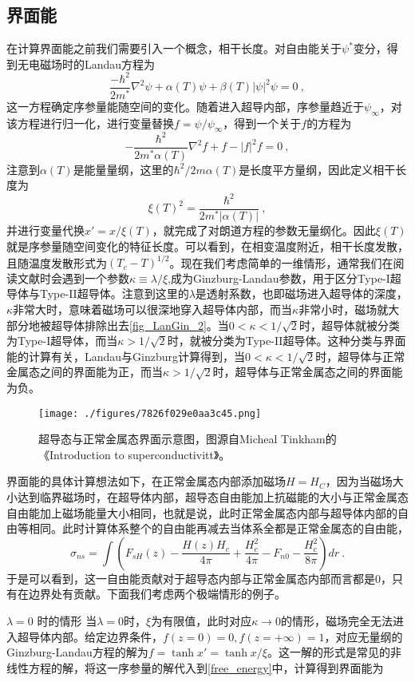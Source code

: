 \subsection{界面能}
在计算界面能之前我们需要引入一个概念，相干长度。对自由能关于$\psi^*$变分，得到无电磁场时的Landau方程为
\begin{equation}
\frac{-\hbar^2}{2m^*}\nabla^2 \psi + \alpha(T)\psi + \beta(T)|\psi|^2 \psi = 0~,
\end{equation}
这一方程确定序参量能随空间的变化。随着进入超导内部，序参量趋近于$\psi_{\infty}$，对该方程进行归一化，进行变量替换$f= \psi/\psi_{\infty}$，得到一个关于$f$的方程为
\begin{equation}
-\frac{\hbar^2}{2m^* \alpha(T)} \nabla^2 f + f - |f|^2 f =0 ~,
\end{equation}
注意到$\alpha(T)$是能量量纲，这里的$\hbar^2/2m \alpha(T)$是长度平方量纲，因此定义相干长度为
\begin{equation}
\xi(T)^2 =\frac{\hbar^2}{2m^* |\alpha(T)|}~,
\end{equation}
并进行变量代换$x' = x/\xi(T)$，就完成了对朗道方程的参数无量纲化。因此$\xi(T)$就是序参量随空间变化的特征长度。可以看到，在相变温度附近，相干长度发散，且随温度发散形式为$(T_c-T)^{1/2}$。现在我们考虑简单的一维情形，通常我们在阅读文献时会遇到一个参数$\kappa \equiv \lambda/\xi$,成为Ginzburg-Landau参数，用于区分Type-I超导体与Type-II超导体。注意到这里的$\lambda$是透射系数，也即磁场进入超导体的深度，$\kappa$非常大时，意味着磁场可以很深地穿入超导体内部，而当$\kappa$非常小时，磁场就大部分地被超导体排除出去\autoref{fig_LanGin_2}。当$0<\kappa<1/\sqrt{2}$时，超导体就被分类为Type-I超导体，而当$\kappa>1/\sqrt{2}$时，就被分类为Type-II超导体。这种分类与界面能的计算有关，Landau与Ginzburg计算得到，当$0<\kappa<1/\sqrt{2}$时，超导体与正常金属态之间的界面能为正，而当$\kappa>1/\sqrt{2}$时，超导体与正常金属态之间的界面能为负。
\begin{figure}[ht]
\centering
\texttt{[image: ./figures/7826f029e0aa3c45.png]}
\caption{超导态与正常金属态界面示意图，图源自Micheal Tinkham的《Introduction to superconductivitt》。} \label{fig_LanGin_2}
\end{figure}
界面能的具体计算想法如下，在正常金属态内部添加磁场$H=H_C$，因为当磁场大小达到临界磁场时，在超导体内部，超导态自由能加上抗磁能的大小与正常金属态自由能加上磁场能量大小相同，也就是说，此时正常金属态内部与超导体内部的自由等相同。此时计算体系整个的自由能再减去当体系全都是正常金属态的自由能，
\begin{equation}
\sigma_{ns} = \int \left( F_{sH}(z) - \frac{H(z)H_c}{4\pi} + \frac{H_c^2}{4\pi} -F_{n0} - \frac{H_c^2}{8\pi}\right)dr~.
\label{free_energy}
\end{equation}
于是可以看到，这一自由能贡献对于超导态内部与正常金属态内部而言都是0，只有在边界处有贡献。下面我们考虑两个极端情形的例子。\begin{example}{$\lambda =0$ 时的情形}
当$\lambda=0$时，$\xi$为有限值，此时对应$\kappa \rightarrow 0$的情形，磁场完全无法进入超导体内部。给定边界条件，$f(z=0)=0, f(z=+\infty) = 1$，对应无量纲的Ginzburg-Landau方程的解为$f=\tanh x' = \tanh x/\xi$。这一解的形式是常见的非线性方程的解，将这一序参量的解代入到\autoref{free_energy}中，计算得到界面能为
\end{example}

